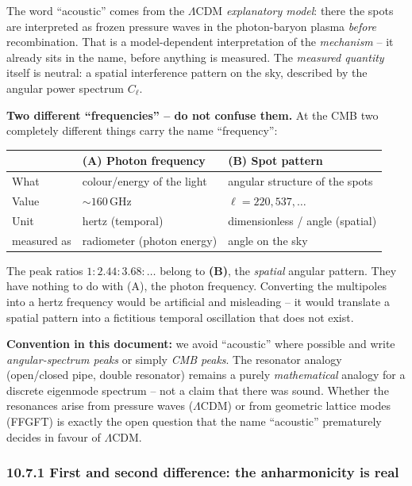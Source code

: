The word ``acoustic'' comes from the $\Lambda$CDM \emph{explanatory
model}: there the spots are interpreted as frozen pressure waves in
the photon-baryon plasma \emph{before} recombination. That is a
model-dependent interpretation of the \emph{mechanism} -- it already
sits in the name, before anything is measured. The \emph{measured
quantity} itself is neutral: a spatial interference pattern on the
sky, described by the angular power spectrum $C_\ell$.

\textbf{Two different ``frequencies'' -- do not confuse them.} At the
CMB two completely different things carry the name ``frequency'':

\begin{center}
\begin{tabular}{p{1cm}p{5.3cm}p{5.3cm}}
\toprule
 & \textbf{(A) Photon frequency} & \textbf{(B) Spot pattern} \\
\midrule
What & colour/energy of the light & angular structure of the spots \\
Value & $\sim 160$\,GHz & $\ell = 220, 537, \ldots$ \\
Unit & hertz (temporal) & dimensionless / angle (spatial) \\
measured as & radiometer (photon energy) & angle on the sky \\
\bottomrule
\end{tabular}
\end{center}

The peak ratios $1:2{.}44:3{.}68:\ldots$ belong to \textbf{(B)},
the \emph{spatial} angular pattern. They have nothing to do with (A),
the photon frequency. Converting the multipoles into a hertz frequency
would be artificial and misleading -- it would translate a spatial
pattern into a fictitious temporal oscillation that does not exist.

\textbf{Convention in this document:} we avoid ``acoustic'' where
possible and write \emph{angular-spectrum peaks} or simply
\emph{CMB peaks}. The resonator analogy (open/closed pipe, double
resonator) remains a purely \emph{mathematical} analogy for a discrete
eigenmode spectrum -- not a claim that there was sound. Whether the
resonances arise from pressure waves ($\Lambda$CDM) or from geometric
lattice modes (FFGFT) is exactly the open question that the name
``acoustic'' prematurely decides in favour of $\Lambda$CDM.

\subsubsection*{10.7.1 First and second difference: the anharmonicity is real}

